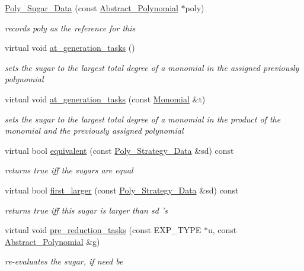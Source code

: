 \begin{DoxyCompactItemize}
\item 
\hyperlink{group__strategygroup_a0d9e2f66a44f2e10d26b977c55650f7f}{Poly\+\_\+\+Sugar\+\_\+\+Data} (const \hyperlink{group__polygroup_class_abstract___polynomial}{Abstract\+\_\+\+Polynomial} $\ast$poly)
\begin{DoxyCompactList}\small\item\em records {\ttfamily poly} as the reference for {\ttfamily this} \end{DoxyCompactList}\item 
\mbox{\label{group__strategygroup_ada533e5c56d7f53207a5e8093414dfb3}} 
virtual void \hyperlink{group__strategygroup_ada533e5c56d7f53207a5e8093414dfb3}{at\+\_\+generation\+\_\+tasks} ()
\begin{DoxyCompactList}\small\item\em sets the sugar to the largest total degree of a monomial in the assigned previously polynomial \end{DoxyCompactList}\item 
virtual void \hyperlink{group__strategygroup_aa80c660f10b1c5d0dd2a305d598685f5}{at\+\_\+generation\+\_\+tasks} (const \hyperlink{group__polygroup_class_monomial}{Monomial} \&t)
\begin{DoxyCompactList}\small\item\em sets the sugar to the largest total degree of a monomial in the product of the monomial and the previously assigned polynomial \end{DoxyCompactList}\item 
virtual bool \hyperlink{group__strategygroup_a73df53a8da9e4cfaf66202a1451d5b2e}{equivalent} (const \hyperlink{group__strategygroup_class_poly___strategy___data}{Poly\+\_\+\+Strategy\+\_\+\+Data} \&sd) const
\begin{DoxyCompactList}\small\item\em returns {\ttfamily true} iff the sugars are equal \end{DoxyCompactList}\item 
virtual bool \hyperlink{group__strategygroup_a9ccb90a43591e465479258bdf10b5b20}{first\+\_\+larger} (const \hyperlink{group__strategygroup_class_poly___strategy___data}{Poly\+\_\+\+Strategy\+\_\+\+Data} \&sd) const
\begin{DoxyCompactList}\small\item\em returns {\ttfamily true} iff {\ttfamily this} sugar is larger than {\ttfamily sd} 's \end{DoxyCompactList}\item 
virtual void \hyperlink{group__strategygroup_a1b2e8a7fe4fcd57555fa58e48620b2bf}{pre\+\_\+reduction\+\_\+tasks} (const E\+X\+P\+\_\+\+T\+Y\+PE $\ast$u, const \hyperlink{group__polygroup_class_abstract___polynomial}{Abstract\+\_\+\+Polynomial} \&g)
\begin{DoxyCompactList}\small\item\em re-\/evaluates the sugar, if need be \end{DoxyCompactList}\end{DoxyCompactItemize}
